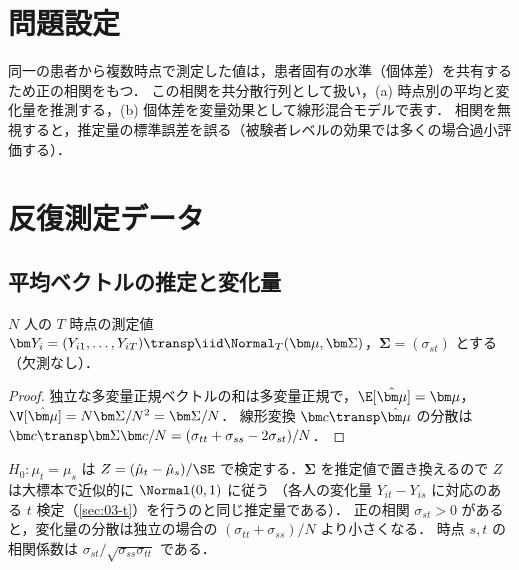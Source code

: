 \section{問題設定}\label{sec:08-setting}
同一の患者から複数時点で測定した値は，患者固有の水準（個体差）を共有するため正の相関をもつ．
この相関を共分散行列として扱い，(a) 時点別の平均と変化量を推測する，(b) 個体差を変量効果として線形混合モデルで表す．
相関を無視すると，推定量の標準誤差を誤る（被験者レベルの効果では多くの場合過小評価する）．

\section{反復測定データ}\label{sec:08-repeated}
\subsection{平均ベクトルの推定と変化量}\label{subsec:08-mean}
\Hissu\Hinshutsu $N$ 人の $T$ 時点の測定値 $\bm Y_i=(Y_{i1},\dots,Y_{iT})\transp\iid\Normal_T(\bm\mu,\bm\Sigma)$，$\bm\Sigma=(\sigma_{st})$ とする（欠測なし）．
\begin{proof}
独立な多変量正規ベクトルの和は多変量正規で，$\E[\hat{\bm\mu}]=\bm\mu$，$\V[\hat{\bm\mu}]=N\bm\Sigma/N^2=\bm\Sigma/N$．
線形変換 $\bm c\transp\hat{\bm\mu}$ の分散は $\bm c\transp\bm\Sigma\bm c/N=(\sigma_{tt}+\sigma_{ss}-2\sigma_{st})/N$．
\end{proof}
$H_0:\mu_t=\mu_s$ は $Z=(\hat\mu_t-\hat\mu_s)/\SE$ で検定する．$\bm\Sigma$ を推定値で置き換えるので $Z$ は大標本で近似的に $\Normal(0,1)$ に従う
（各人の変化量 $Y_{it}-Y_{is}$ に対応のある $t$ 検定（\cref{sec:03-t}）を行うのと同じ推定量である）．
正の相関 $\sigma_{st}>0$ があると，変化量の分散は独立の場合の $(\sigma_{tt}+\sigma_{ss})/N$ より小さくなる．
時点 $s,t$ の相関係数は $\sigma_{st}/\sqrt{\sigma_{ss}\sigma_{tt}}$ である．

